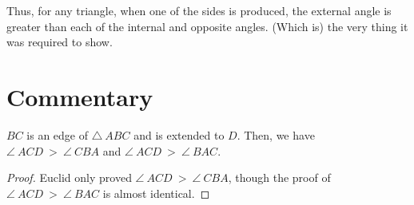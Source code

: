 Thus, for any triangle, when one of the sides is produced, the external angle
is greater than each of the internal and opposite angles. (Which is) the very thing
it was required to show.


\section*{Commentary}

\begin{proposition}\label{proposition_16}\leanok
    $BC$ is an edge of $\triangle~ABC$ and is extended to $D$. Then, we have $\angle~ACD~>~\angle~CBA$ and $\angle~ACD~>~\angle~BAC$.
\end{proposition}
\begin{proof}
    \leanok
    Euclid only proved $\angle~ACD~>~\angle~CBA$, though the proof of $\angle~ACD~>~\angle~BAC$ is almost identical.
\end{proof}
